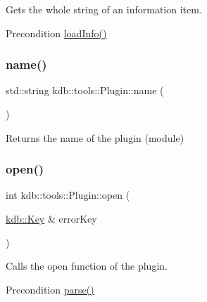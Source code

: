 Gets the whole string of an information item. 

\begin{DoxyPrecond}{Precondition}
\hyperlink{classkdb_1_1tools_1_1Plugin_a3a0c6a956d1714002ef9baf8c9d99167}{load\+Info()} 
\end{DoxyPrecond}
\mbox{\label{classkdb_1_1tools_1_1Plugin_ae4b82f943d0cdb0dd355924aa3201d6f}} 
\subsubsection{\texorpdfstring{name()}{name()}}
{\footnotesize\ttfamily std\+::string kdb\+::tools\+::\+Plugin\+::name (\begin{DoxyParamCaption}{ }\end{DoxyParamCaption})}

\begin{DoxyReturn}{Returns}
the name of the plugin (module) 
\end{DoxyReturn}
\mbox{\label{classkdb_1_1tools_1_1Plugin_a680a490123b5290441d76ef2c1e3f1fa}} 
\subsubsection{\texorpdfstring{open()}{open()}}
{\footnotesize\ttfamily int kdb\+::tools\+::\+Plugin\+::open (\begin{DoxyParamCaption}\item[{\hyperlink{classkdb_1_1Key}{kdb\+::\+Key} \&}]{error\+Key }\end{DoxyParamCaption})}



Calls the open function of the plugin. 

\begin{DoxyPrecond}{Precondition}
\hyperlink{classkdb_1_1tools_1_1Plugin_adfcba2fbdeb436a1083410df804d5fb0}{parse()} 
\end{DoxyPrecond}
\mbox{\label{classkdb_1_1tools_1_1Plugin_adfcba2fbdeb436a1083410df804d5fb0}} 
